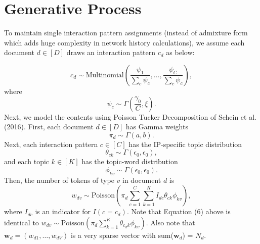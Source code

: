 \documentclass[11pt]{article}
\begin{document}
\maketitle


\section{Generative Process}
To maintain single interaction pattern assignments (instead of admixture form which adds huge complexity in network history calculations), we assume each document $d \in [D]$ draws an interaction pattern $c_d$ as below:
\iffalse
\begin{equation}
c_d\sim \mbox{Multinomial}(\boldsymbol{\psi}),
\end{equation}
where 
\begin{equation}
\psi \sim \mbox{Dirichlet}\Big(\xi, (\frac{1}{C},\ldots,\frac{1}{C})\Big).
\end{equation}
Alternatively, following degree-corrected GPIRM we can use
\fi
\begin{equation}
c_d\sim \mbox{Multinomial}(\frac{\psi_1}{\sum_c \psi_c},\ldots,\frac{\psi_C}{\sum_c \psi_c}),
\end{equation}
where 
\begin{equation}
\psi_c\sim \Gamma(\frac{\gamma_0}{C}, \xi).
\end{equation}
Next, we model the contents using Poisson Tucker Decomposition of Schein et al. (2016). First, each document $d \in [D]$ has Gamma weights
\begin{equation}
\pi_{d}\sim \Gamma(a, b).
\end{equation}
Next, each interaction pattern $c \in [C]$ has the IP-specific topic distribution
\begin{equation}
\theta_{ck} \sim  \Gamma(\epsilon_0,\epsilon_0),
\end{equation}
and each topic $k\in[K]$ has the topic-word distribution
\begin{equation}
\phi_{kv} \sim  \Gamma(\epsilon_0,\epsilon_0).
\end{equation}
Then, the number of tokens of type $v$ in document $d$ is
\begin{equation}
w_{dv} \sim \mbox{Poisson}(\pi_{d}\sum_{c=1}^C \sum_{k=1}^K I_{dc} \theta_{ck}\phi_{kv}),
\end{equation}
where $I_{dc}$ is an indicator for $I(c=c_d)$. Note that Equation (6) above is identical to $w_{dv} \sim \mbox{Poisson}(\pi_{d}\sum_{k=1}^K \theta_{c_dk}\phi_{kv})$. Also note that $\boldsymbol{w}_d = (w_{d1},\ldots,w_{dV})$ is a very sparse vector with sum($\boldsymbol{w}_d$) = $N_d$. 
\end{document}
